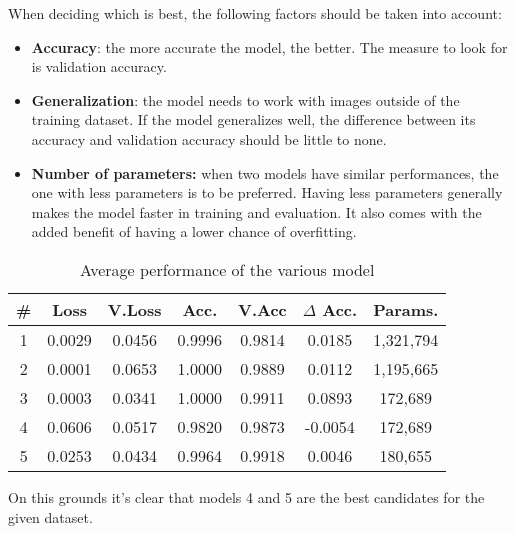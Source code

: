 
When deciding which is best, the following factors should be taken into account:
\begin{itemize}
\item \textbf{Accuracy}: the more accurate the model, the better. The measure to look for is validation accuracy.
\item \textbf{Generalization}: the model needs to work with images outside of the training dataset. If the model generalizes well, the difference between its accuracy and validation accuracy should be little to none.
\item \textbf{Number of parameters:} when two models have similar performances, the one with less parameters is to be preferred. Having less parameters generally makes the model faster in training and evaluation. It also comes with the added benefit of having a lower chance of overfitting.
\end{itemize}

\begin{table}[H]
	\centering
	\begin{tabular}{ccc cccc}
	\textbf{\#} & \textbf{Loss} & \textbf{V.Loss} & \textbf{Acc.} & \textbf{V.Acc} & \textbf{$\Delta$ Acc.} & \textbf{Params.}\\ \hline
	1 & 0.0029 & 0.0456 & 0.9996 & 0.9814 & 0.0185 & 1,321,794\\ 
	2 & 0.0001 & 0.0653 & 1.0000	& 0.9889 & 0.0112 & 1,195,665\\
	3 & 0.0003 & 0.0341 & 1.0000 & 0.9911 & 0.0893 & 172,689\\
	4 & 0.0606 & 0.0517 & 0.9820 & 0.9873 & -0.0054 & 172,689\\
	5 & 0.0253 & 0.0434 & 0.9964 & 0.9918 & 0.0046 & 180,655\\
	\end{tabular}
	\caption{Average performance of the various model}
\end{table}

On this grounds it's clear that models 4 and 5 are the best candidates for the given dataset.